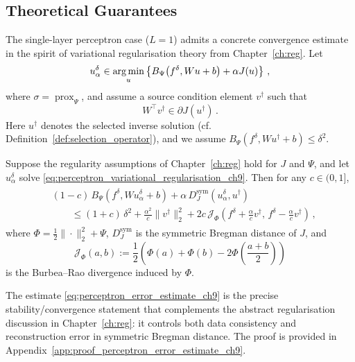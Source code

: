 \subsection{Theoretical Guarantees}
The single-layer perceptron case ($L=1$) admits a concrete convergence estimate in the spirit of variational regularisation theory from Chapter~\ref{ch:reg}. Let
\begin{equation}\label{eq:perceptron_variational_regularisation_ch9}
    u_\alpha^\delta \in \operatorname*{arg\,min}_{u} \left\{ B_\Psi\!\left(f^\delta, Wu+b\right) + \alpha J(u) \right\} \, ,
\end{equation}
where $\sigma = \operatorname{prox}_\Psi$, and assume a source condition element $v^\dagger$ such that
\begin{equation}\label{eq:source_condition_perceptron_ch9}
    W^\top v^\dagger \in \partial J(u^\dagger) \, .
\end{equation}
Here $u^\dagger$ denotes the selected inverse solution (cf. Definition~\ref{def:selection_operator}), and we assume $B_\Psi(f^\delta, Wu^\dagger+b) \le \delta^2$.

\begin{thm}\label{thm:perceptron_error_estimate_ch9}
Suppose the regularity assumptions of Chapter~\ref{ch:reg} hold for $J$ and $\Psi$, and let $u_\alpha^\delta$ solve \eqref{eq:perceptron_variational_regularisation_ch9}. Then for any $c\in(0,1]$,
\begin{align}
    \begin{split}
    &(1-c)\,B_\Psi\!\left(f^\delta, Wu_\alpha^\delta+b\right) + \alpha\,D_J^{\mathrm{sym}}(u_\alpha^\delta,u^\dagger) \\
    &\qquad\le (1+c)\,\delta^2 + \frac{\alpha^2}{c}\|v^\dagger\|_2^2 + 2c\,\mathcal{J}_{\Phi}\!\left(f^\delta+\frac{\alpha}{c}v^\dagger,\,f^\delta-\frac{\alpha}{c}v^\dagger\right) \, ,
    \end{split}
    \label{eq:perceptron_error_estimate_ch9}
\end{align}
where $\Phi=\frac12\|\cdot\|_2^2+\Psi$, $D_J^{\mathrm{sym}}$ is the symmetric Bregman distance of $J$, and
\begin{equation*}
    \mathcal{J}_{\Phi}(a,b):=\frac12\left(\Phi(a)+\Phi(b)-2\Phi\left(\frac{a+b}{2}\right)\right)
\end{equation*}
is the Burbea--Rao divergence induced by $\Phi$.
\end{thm}

The estimate \eqref{eq:perceptron_error_estimate_ch9} is the precise stability/convergence statement that complements the abstract regularisation discussion in Chapter~\ref{ch:reg}: it controls both data consistency and reconstruction error in symmetric Bregman distance. The proof is provided in Appendix~\ref{app:proof_perceptron_error_estimate_ch9}.

